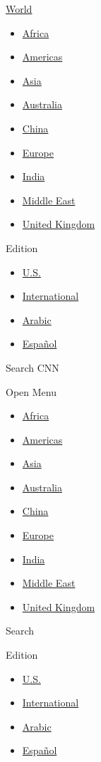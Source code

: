 \href{/world}{World}

\begin{itemize}
\tightlist
\item
  \href{/africa}{Africa}
\item
  \href{/americas}{Americas}
\item
  \href{/asia}{Asia}
\item
  \href{/australia}{Australia}
\item
  \href{/china}{China}
\item
  \href{/europe}{Europe}
\item
  \href{/india}{India}
\item
  \href{/middle-east}{Middle East}
\item
  \href{/uk}{United Kingdom}
\end{itemize}

Edition

\begin{itemize}
\tightlist
\item
  \href{//us.cnn.com?hpt=header_edition-picker}{U.S.}
\item
  \href{//edition.cnn.com?hpt=header_edition-picker}{International}
\item
  \href{//arabic.cnn.com?hpt=header_edition-picker}{Arabic}
\item
  \href{//cnnespanol.cnn.com?hpt=header_edition-picker}{Español}
\end{itemize}

Search CNN

Open Menu

\begin{itemize}
\tightlist
\item
  \href{/africa}{Africa}
\item
  \href{/americas}{Americas}
\item
  \href{/asia}{Asia}
\item
  \href{/australia}{Australia}
\item
  \href{/china}{China}
\item
  \href{/europe}{Europe}
\item
  \href{/india}{India}
\item
  \href{/middle-east}{Middle East}
\item
  \href{/uk}{United Kingdom}
\end{itemize}

Search

Edition

\begin{itemize}
\tightlist
\item
  \href{//us.cnn.com?hpt=header_edition-picker}{U.S.}
\item
  \href{//edition.cnn.com?hpt=header_edition-picker}{International}
\item
  \href{//arabic.cnn.com?hpt=header_edition-picker}{Arabic}
\item
  \href{//cnnespanol.cnn.com?hpt=header_edition-picker}{Español}
\end{itemize}

